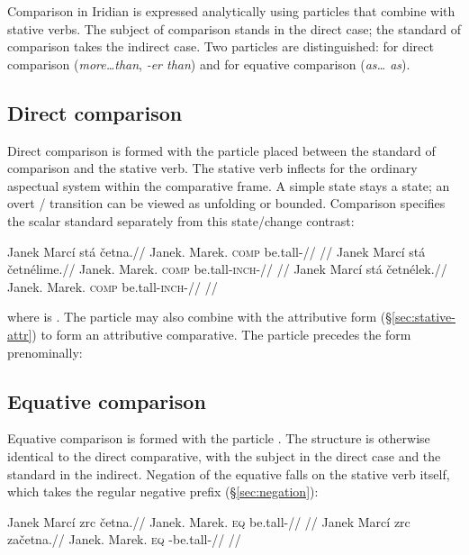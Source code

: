 Comparison in Iridian is expressed analytically using particles that combine
with stative verbs. The subject of comparison stands in the direct case; the
standard of comparison takes the indirect case. Two particles are
distinguished:  for direct comparison (\textit{more\ldots than},
\textit{-er than}) and  for equative comparison (\textit{as\ldots
as}).

\subsection{Direct comparison}

Direct comparison is formed with the particle  placed between the
standard of comparison and the stative verb. The stative verb inflects for the
ordinary aspectual system within the comparative frame. A simple state stays
a state; an overt / transition can be viewed as
unfolding or bounded. Comparison specifies the scalar standard separately
from this state/change contrast:

\pex
\a
\begingl
\gla Janek Marcí stá četna.//
\glb Janek.\Dir{} Marek.\Ind{} \textsc{comp} be.tall-\Cont{}//
\glft {}//
\endgl
\a
\begingl
\gla Janek Marcí stá četnélime.//
\glb Janek.\Dir{} Marek.\Ind{} \textsc{comp} be.tall-\textsc{inch}-\Prog{}//
\glft {}//
\endgl
\a
\begingl
\gla Janek Marcí stá četnélek.//
\glb Janek.\Dir{} Marek.\Ind{} \textsc{comp} be.tall-\textsc{inch}-\Pf{}//
\glft {}//
\endgl
\xe

\noindent where  is . The particle  may also
combine with the  attributive form (§\ref{sec:stative-attr}) to form
an attributive comparative. The particle precedes the  form
prenominally:

\pex
\a {} 
\a {} 
\xe

\subsection{Equative comparison}

Equative comparison is formed with the particle . The structure is
otherwise identical to the direct comparative, with the subject in the direct
case and the standard in the indirect. Negation of the equative falls on the
stative verb itself, which takes the regular negative prefix 
(§\ref{sec:negation}):

\pex
\a
\begingl
\gla Janek Marcí zrc četna.//
\glb Janek.\Dir{} Marek.\Ind{} \textsc{eq} be.tall-\Cont{}//
\glft {}//
\endgl
\a
\begingl
\gla Janek Marcí zrc začetna.//
\glb Janek.\Dir{} Marek.\Ind{} \textsc{eq} \Neg{}-be.tall-\Cont{}//
\glft {}//
\endgl
\xe
